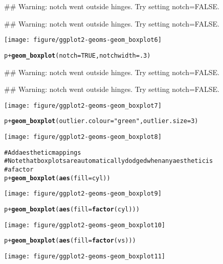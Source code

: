 \documentclass[a4paper,titlepage]{tufte-handout}\usepackage{graphicx, color}
\makeatletter
\def\maxwidth{ %
  \ifdim\Gin@nat@width>\linewidth
    \linewidth
  \else
    \Gin@nat@width
  \fi
}
\newcommand{\hlfunctioncall}[1]{\textcolor[rgb]{0.501960784313725,0,0.329411764705882}{\textbf{#1}}}%
\newcommand{\hlstring}[1]{\textcolor[rgb]{0.6,0.6,1}{#1}}%
\newcommand{\hlcomment}[1]{\textcolor[rgb]{0.180392156862745,0.6,0.341176470588235}{#1}}%
\newenvironment{kframe}{%
 \def\at@end@of@kframe{}%
 \ifinner\ifhmode%
  \def\at@end@of@kframe{\end{minipage}}%
  \begin{minipage}{\columnwidth}%
 \fi\fi%
 \def\FrameCommand##1{\hskip\@totalleftmargin \hskip-\fboxsep
 \colorbox{shadecolor}{##1}\hskip-\fboxsep
     \hskip-\linewidth \hskip-\@totalleftmargin \hskip\columnwidth}%
 \MakeFramed {\advance\hsize-\width
   \@totalleftmargin\z@ \linewidth\hsize
   \@setminipage}}%
 {\par\unskip\endMakeFramed%
 \at@end@of@kframe}
\newenvironment{knitrout}{}{} %
\makeatother
\begin{document}
\begin{knitrout}
\begin{kframe}
{\ttfamily\noindent\textcolor{warningcolor}{\#\# Warning: notch went outside hinges. Try setting notch=FALSE.}}

{\ttfamily\noindent\textcolor{warningcolor}{\#\# Warning: notch went outside hinges. Try setting notch=FALSE.}}\end{kframe}\texttt{[image: figure/ggplot2-geoms-geom\_boxplot6]} \begin{kframe}\begin{alltt}
p + \hlfunctioncall{geom_boxplot}(notch = TRUE, notchwidth = .3)
\end{alltt}


{\ttfamily\noindent\textcolor{warningcolor}{\#\# Warning: notch went outside hinges. Try setting notch=FALSE.}}

{\ttfamily\noindent\textcolor{warningcolor}{\#\# Warning: notch went outside hinges. Try setting notch=FALSE.}}\end{kframe}\texttt{[image: figure/ggplot2-geoms-geom\_boxplot7]} \begin{kframe}\begin{alltt}
p + \hlfunctioncall{geom_boxplot}(outlier.colour = \hlstring{"green"}, outlier.size = 3)
\end{alltt}
\end{kframe}\texttt{[image: figure/ggplot2-geoms-geom\_boxplot8]} \begin{kframe}\begin{alltt}
\hlcomment{# Add aesthetic mappings}
\hlcomment{# Note that boxplots are automatically dodged when any aesthetic is}
\hlcomment{# a factor}
p + \hlfunctioncall{geom_boxplot}(\hlfunctioncall{aes}(fill = cyl))
\end{alltt}
\end{kframe}\texttt{[image: figure/ggplot2-geoms-geom\_boxplot9]} \begin{kframe}\begin{alltt}
p + \hlfunctioncall{geom_boxplot}(\hlfunctioncall{aes}(fill = \hlfunctioncall{factor}(cyl)))
\end{alltt}
\end{kframe}\texttt{[image: figure/ggplot2-geoms-geom\_boxplot10]} \begin{kframe}\begin{alltt}
p + \hlfunctioncall{geom_boxplot}(\hlfunctioncall{aes}(fill = \hlfunctioncall{factor}(vs)))
\end{alltt}
\end{kframe}\texttt{[image: figure/ggplot2-geoms-geom\_boxplot11]} \begin{kframe}\begin{alltt}

\end{alltt}
\end{kframe}
\end{knitrout}
\end{document}
